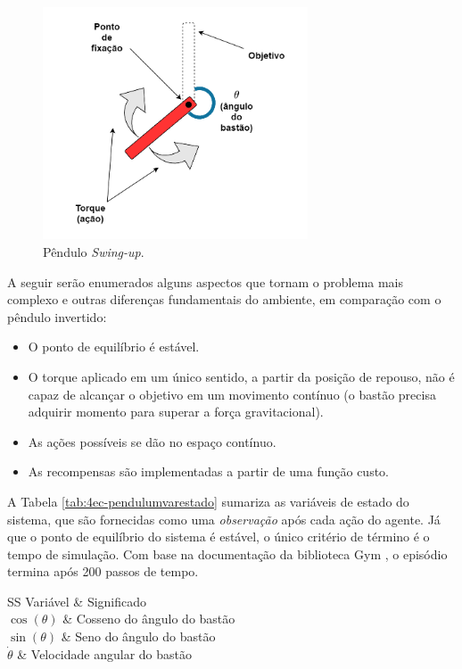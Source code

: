 \begin{figure}[H]
	\centering
	\includegraphics[width=0.7\textwidth]{02_desenvolvimento/04_EC_Fig_PendulumEnv2.png}
	\caption{Pêndulo \textit{Swing-up}.}
	\label{fig:4ec-pendulumenv}
\end{figure}

A seguir serão enumerados alguns aspectos que tornam o problema mais complexo e outras diferenças fundamentais do ambiente, em comparação com o pêndulo invertido:

\begin{itemize}[label=\raisebox{0.25ex}{\tiny$\bullet$}]
	\item O ponto de equilíbrio é estável.
	\item O torque aplicado em um único sentido, a partir da posição de repouso, não é capaz de alcançar o objetivo em um movimento contínuo (o bastão precisa adquirir momento para superar a força gravitacional).
	\item As ações possíveis se dão no espaço contínuo.
	\item As recompensas são implementadas a partir de uma função custo.
\end{itemize}

A Tabela \ref{tab:4ec-pendulumvarestado} sumariza as variáveis de estado do sistema, que são fornecidas como uma \textit{observação} após cada ação do agente. Já que o ponto de equilíbrio do sistema é estável, o único critério de término é o tempo de simulação. Com base na documentação da biblioteca Gym \cite{openaigym}, o episódio termina após 200 passos de tempo. 

\begin{table}[!htb]
	\centering
	\caption{Variáveis de estado para o pêndulo swing-up.}
	\label{tab:4ec-pendulumvarestado}
	\begin{tabular}{SS} \toprule
		{Variável} & {Significado}\\ \midrule
		{$\cos(\theta)$} & {Cosseno do ângulo do bastão} \\
		{$\sin(\theta)$} & {Seno do ângulo do bastão} \\
		{$\dot{\theta}$} & {Velocidade angular do bastão} \\ 
		\bottomrule
	\end{tabular}
\end{table}

